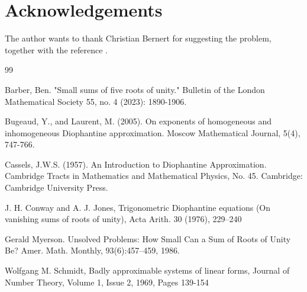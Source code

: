 \documentclass[12pt]{article}
\theoremstyle{definition}
\begin{document}
\section{Acknowledgements}
The author wants to thank Christian Bernert for suggesting the problem, together with the reference \cite{benb}.



\begin{thebibliography}{99}




Barber, Ben. "Small sums of five roots of unity." Bulletin of the London Mathematical Society 55, no. 4 (2023): 1890-1906.

Bugeaud, Y., and Laurent, M. (2005). On exponents of homogeneous and inhomogeneous Diophantine approximation. Moscow Mathematical Journal, 5(4), 747-766.

Cassels, J.W.S. (1957). An Introduction to Diophantine Approximation. Cambridge Tracts in Mathematics and Mathematical Physics, No. 45. Cambridge: Cambridge University Press.

J. H. Conway and A. J. Jones, Trigonometric Diophantine equations (On vanishing sums of
roots of unity), Acta Arith. 30 (1976), 229–240

Gerald Myerson. Unsolved Problems: How Small Can a Sum of Roots of Unity Be?
Amer. Math. Monthly, 93(6):457–459, 1986.

Wolfgang M. Schmidt,
Badly approximable systems of linear forms,
Journal of Number Theory,
Volume 1, Issue 2,
1969,
Pages 139-154


\end{thebibliography}
\end{document}
